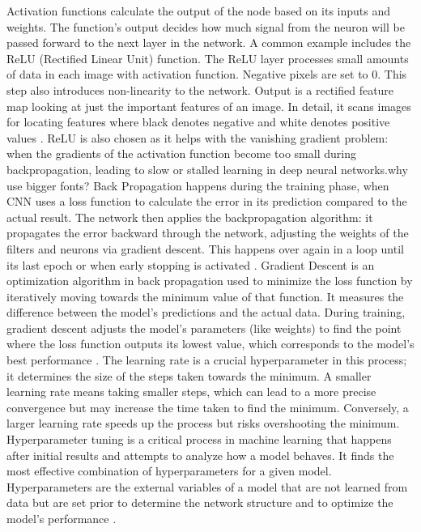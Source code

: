 \documentclass[10pt,twocolumn]{article}
\begin{document}
\newline
\newline
Activation functions calculate the output of the node based on its inputs and weights. The function's output decides how much signal from the neuron will be passed forward to the next layer in the network. A common example includes the ReLU (Rectified Linear Unit) function. The ReLU layer processes small amounts of data in each image with activation function. Negative pixels are set to 0. This step also introduces non-linearity to the network. Output is a rectified feature map looking at just the important features of an image. In detail, it scans images for locating features where black denotes negative and white denotes positive values \cite{GeeksforGeeks_2019}. ReLU is also chosen as it helps with the vanishing gradient problem: when the gradients of the activation function become too small during backpropagation, leading to slow or stalled learning in deep neural networks.why use bigger fonts?
\newline
\newline
Back Propagation happens during the training phase, when CNN uses a loss function to calculate the error in its prediction compared to the actual result. The network then applies the backpropagation algorithm: it propagates the error backward through the network, adjusting the weights of the filters and neurons via gradient descent. This happens over again in a loop until its last epoch or when early stopping is activated \cite{Roy_2020}.
\newline
\newline
Gradient Descent is an optimization algorithm in back propagation used to minimize the loss function by iteratively moving towards the minimum value of that function. It measures the difference between the model's predictions and the actual data. During training, gradient descent adjusts the model's parameters (like weights) to find the point where the loss function outputs its lowest value, which corresponds to the model's best performance \cite{Roy_2020}. 
\newline
The learning rate is a crucial hyperparameter in this process; it determines the size of the steps taken towards the minimum. A smaller learning rate means taking smaller steps, which can lead to a more precise convergence but may increase the time taken to find the minimum. Conversely, a larger learning rate speeds up the process but risks overshooting the minimum.
\newline
Hyperparameter tuning is a critical process in machine learning that happens after initial results and attempts to analyze how a model behaves. It finds the most effective combination of hyperparameters for a given model. Hyperparameters are the external variables of a model that are not learned from data but are set prior to determine the network structure and to optimize the model’s performance \cite{Amazon_1978}. 
\end{document}
